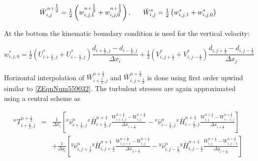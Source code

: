 \documentclass{article}
\begin{document}
\noindent 
\begin{equation} \label{ZEqnNum287705} 
\bar{W}_{i,j}^{n+{\tfrac{1}{2}} } ={\tfrac{1}{2}} \left(w_{i,j,1}^{n+{\tfrac{1}{2}} } +w_{i,j,0}^{n+{\tfrac{1}{2}} } \right),{\rm \; \; \; \; \; \; }\bar{W}_{i,j}^{*} ={\tfrac{1}{2}} \left(w_{i,j,1}^{*} +w_{i,j,0}^{*} \right) 
\end{equation} 


\noindent At the bottom the kinematic boundary condition is used for the vertical velocity:

\noindent 
\begin{equation} \label{ZEqnNum183135} 
w_{i,j,0}^{*} ={\tfrac{1}{2}} \left(U_{i+{\tfrac{1}{2}} ,j}^{*} +U_{i-{\tfrac{1}{2}} ,j}^{*} \right)\frac{d_{i+{\tfrac{1}{2}} ,j} -d_{i-{\tfrac{1}{2}} ,j} }{\Delta x_{i} } +{\tfrac{1}{2}} \left(V_{i,j+{\tfrac{1}{2}} }^{*} +V_{i,j-{\tfrac{1}{2}} }^{*} \right)\frac{d_{i,j+{\tfrac{1}{2}} } -d_{i,j-{\tfrac{1}{2}} } }{\Delta x_{j} }  
\end{equation} 


\noindent Horizontal interpolation of $\bar{W}_{i+{\tfrac{1}{2}} ,j}^{n+{\tfrac{1}{2}} } $ and $\bar{W}_{i,j+{\tfrac{1}{2}} }^{n+{\tfrac{1}{2}} } $ is done using first order upwind similar to \eqref{ZEqnNum559032}. The turbulent stresses are again approximated using a central scheme as

\noindent 
\begin{equation} \label{6.46)} 
\begin{array}{rcl} {{}^{w} T_{i+{\tfrac{1}{2}} ,j}^{n+{\tfrac{1}{2}} } } & {=} & {\frac{1}{\Delta x_{i} } \left[{}^{x} \bar{\nu }_{i+{\tfrac{1}{2}} ,j}^{n} {}^{x} \bar{H}_{i+{\tfrac{1}{2}} ,j}^{n+1} \frac{W_{i+1,j}^{n+{\tfrac{1}{2}} } -W_{i,j}^{n+{\tfrac{1}{2}} } }{\Delta x_{i+{\tfrac{1}{2}} } } -{}^{x} \bar{\nu }_{i-{\tfrac{1}{2}} ,j}^{n} {}^{x} \bar{H}_{i-{\tfrac{1}{2}} ,j}^{n+1} \frac{W_{i,j}^{n+{\tfrac{1}{2}} } -W_{i-1,j}^{n+{\tfrac{1}{2}} } }{\Delta x_{i+{\tfrac{1}{2}} } } \right]} \\ {} & {} & {+\frac{1}{\Delta y_{i} } \left[{}^{y} \bar{\nu }_{i,j+{\tfrac{1}{2}} }^{n} {}^{y} \bar{H}_{i,j+{\tfrac{1}{2}} }^{n+1} \frac{W_{i,j+1}^{n+{\tfrac{1}{2}} } -W_{i,j}^{n+{\tfrac{1}{2}} } }{\Delta x_{j+{\tfrac{1}{2}} } } -{}^{y} \bar{\nu }_{i,j-{\tfrac{1}{2}} }^{n} {}^{y} \bar{H}_{i,j-{\tfrac{1}{2}} }^{n+1} \frac{W_{i,j}^{n+{\tfrac{1}{2}} } -W_{i,j-1}^{n+{\tfrac{1}{2}} } }{\Delta y_{j+{\tfrac{1}{2}} } } \right]} \end{array} 
\end{equation} 
\end{document}
